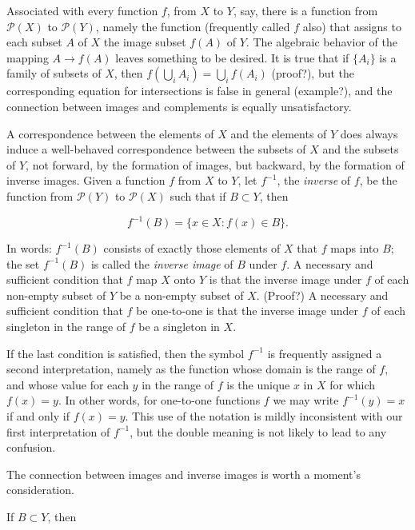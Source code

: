 Associated with every function $f$, from $X$ to $Y$, say, there is a function from $\mathcal{P}(X)$ to $\mathcal{P}(Y)$, namely the function (frequently called $f$ also) that assigns to each subset $A$ of $X$ the image subset $f(A)$ of $Y$. The algebraic behavior of the mapping $A \rightarrow f(A)$ leaves something to be desired. It is true that if $ \{ A_{i} \} $ is a family of subsets of $X$, then $f( \bigcup_{i} A_{i} ) = \bigcup_{i} f( A_{i} )$ (proof?), but the corresponding equation for intersections is false in general (example?), and the connection between images and complements is equally unsatisfactory. 

A correspondence between the elements of $X$ and the elements of $Y$ does always induce a well-behaved correspondence between the subsets of $X$ and the subsets of $Y$, not forward, by the formation of images, but backward, by the formation of inverse images. Given a function $f$ from $X$ to $Y$, let $f^{-1}$, the \textit{inverse} of $f$, be the function from $\mathcal{P}(Y)$ to $\mathcal{P}(X)$ such that if $B \subset Y$, then

\begin{equation*}
f^{-1}(B) = \{ x \in X : f(x) \in B \} .
\end{equation*}

In words: $f^{-1}(B)$ consists of exactly those elements of $X$ that $f$ maps into $B$; the set $f^{-1}(B)$ is called the \textit{inverse image} of $B$ under $f$. A necessary and sufficient condition that $f$ map $X$ onto $Y$ is that the inverse image under $f$ of each non-empty subset of $Y$ be a non-empty subset of $X$. (Proof?) A necessary and sufficient condition that $f$ be one-to-one is that the inverse image under $f$ of each singleton in the range of $f$ be a singleton in $X$. 

If the last condition is satisfied, then the symbol $f^{-1}$ is frequently assigned a second interpretation, namely as the function whose domain is the range of $f$, and whose value for each $y$ in the range of $f$ is the unique $x$ in $X$ for which $f(x) = y$. In other words, for one-to-one functions $f$ we may write $f^{-1}(y) = x$ if and only if $f(x) = y$. This use of the notation is mildly inconsistent with our first interpretation of $f^{-1}$, but the double meaning is not likely to lead to any confusion.

The connection between images and inverse images is worth a moment's consideration. 

If $B \subset Y$, then

